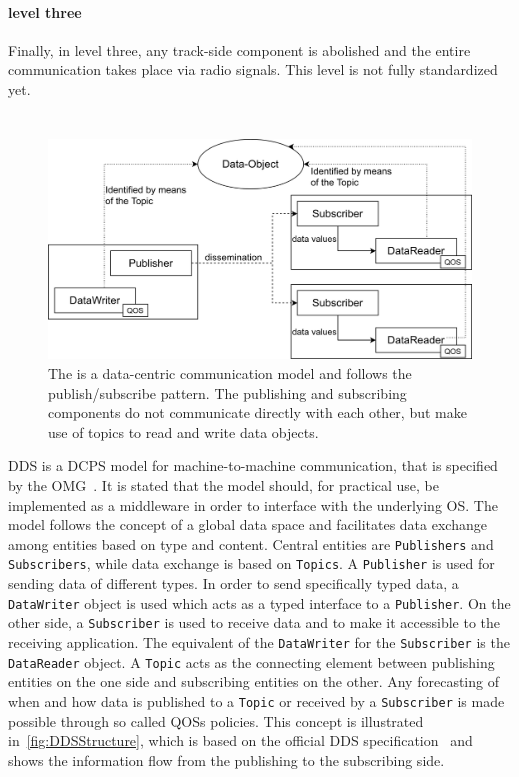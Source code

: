 \paragraph{ level three}
Finally, in  level three, any track-side component is abolished and the entire communication takes place via radio signals.
This  level is not fully standardized yet.

\section{}

\begin{figure}[!hb]
	\centering
	\includegraphics[width=0.8\linewidth]{images/DDSStructure}
	\caption{The  is a data-centric communication model and follows the publish/subscribe pattern. The publishing and subscribing components do not communicate directly with each other, but make use of topics to read and write data objects.}
	\label{fig:DDSStructure}
\end{figure}

\Gls*{DDS} is a \gls*{DCPS} model for machine-to-machine communication, that is specified by the \gls*{OMG}~\cite{omgDDSspec}.
It is stated that the model should, for practical use, be implemented as a middleware in order to interface with the underlying \gls*{OS}.
The model follows the concept of a global data space and facilitates data exchange among entities based on type and content.
Central entities are \texttt{Publishers} and \texttt{Subscribers}, while data exchange is based on \texttt{Topics}.
A \texttt{Publisher} is used for sending data of different types.
In order to send specifically typed data, a \texttt{DataWriter} object is used which acts as a typed interface to a \texttt{Publisher}.
On the other side, a \texttt{Subscriber} is used to receive data and to make it accessible to the receiving application.
The equivalent of the \texttt{DataWriter} for the \texttt{Subscriber} is the \texttt{DataReader} object.
A \texttt{Topic} acts as the connecting element between publishing entities on the one side and subscribing entities on the other.
Any forecasting of when and how data is published to a \texttt{Topic} or received by a \texttt{Subscriber} is made possible through so called \glspl*{QOS} policies.
This concept is illustrated in~\autoref{fig:DDSStructure}, which is based on the official \gls*{DDS} specification~\cite{omgDDSspec} and shows the information flow from the publishing to the subscribing side.

